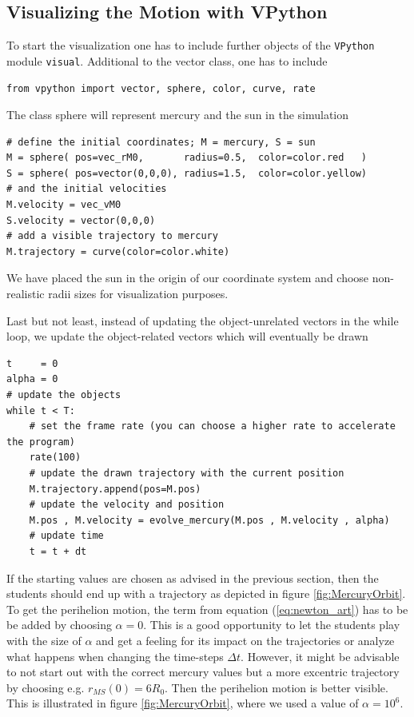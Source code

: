 \documentclass[12pt, UK english]{iopart}
\begin{document}
\subsection{Visualizing the Motion with VPython}
To start the visualization one has to include further objects of the \texttt{VPython} module \texttt{visual}.
Additional to the vector class, one has to include
\begin{lstlisting}
from vpython import vector, sphere, color, curve, rate
\end{lstlisting}
The class sphere will represent mercury and the sun in the simulation
\begin{lstlisting}
# define the initial coordinates; M = mercury, S = sun
M = sphere( pos=vec_rM0,       radius=0.5,  color=color.red   )
S = sphere( pos=vector(0,0,0), radius=1.5,  color=color.yellow)
# and the initial velocities
M.velocity = vec_vM0
S.velocity = vector(0,0,0)
# add a visible trajectory to mercury
M.trajectory = curve(color=color.white)
\end{lstlisting}
We have placed the sun in the origin of our coordinate system and choose non-realistic radii sizes for visualization purposes.

Last but not least, instead of updating the object-unrelated vectors in the while loop, we update the object-related vectors which will eventually be drawn
\begin{lstlisting}
t     = 0
alpha = 0
# update the objects
while t < T:
	# set the frame rate (you can choose a higher rate to accelerate the program)
	rate(100)
	# update the drawn trajectory with the current position
	M.trajectory.append(pos=M.pos)
	# update the velocity and position
	M.pos , M.velocity = evolve_mercury(M.pos , M.velocity , alpha)
	# update time
	t = t + dt
\end{lstlisting}

If the starting values are chosen as advised in the previous section, then the students should end up with a trajectory as depicted in figure \ref{fig:MercuryOrbit}.
To get the perihelion motion, the term from equation (\ref{eq:newton_art}) has to be be added by choosing $\alpha=0$.
This is a good opportunity to let the students play with the size of $\alpha$ and get a feeling for its impact on the trajectories or analyze what happens when changing the time-steps $\Delta t$.
However, it might be advisable to not start out with the correct mercury values but a more excentric trajectory by choosing e.g. $r_{MS}(0)=6R_0$.
Then the perihelion motion is better visible. This is illustrated in figure \ref{fig:MercuryOrbit}, where we used a value of $\alpha=10^6$.
\end{document}
